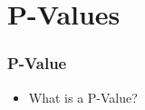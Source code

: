 \documentclass[14pt,handout]{beamer}
\begin{document}


\section{P-Values}

\begin{frame}
\frametitle{P-Value}
\begin{itemize}
	\item<+-> What is a P-Value?
\end{itemize}
\end{frame}


\end{document}
